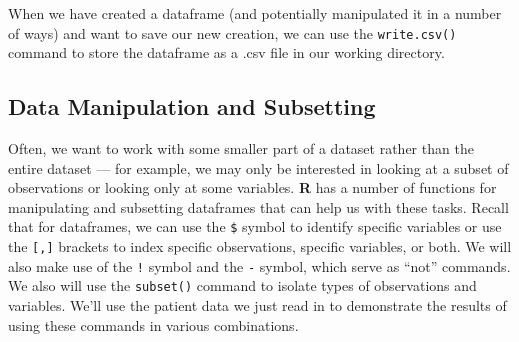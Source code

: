 \documentclass[12pt]{article}\usepackage[]{graphicx}\usepackage[]{color}
\begin{document}
When we have created a dataframe (and potentially manipulated it in a number of ways) and want to save our new creation, we can use the \verb|write.csv()| command to store the dataframe as a .csv file in our working directory.

\subsection{Data Manipulation and Subsetting}
Often, we want to work with some smaller part of a dataset rather than the entire dataset --- for example, we may only be interested in looking at a subset of observations or looking only at some variables. \textbf{R} has a number of functions for manipulating and subsetting dataframes that can help us with these tasks. Recall that for dataframes, we can use the \verb|$| symbol to identify specific variables or use the \verb|[,]| brackets to index specific observations, specific variables, or both. We will also make use of the \verb|!| symbol and the \verb|-| symbol, which serve as ``not'' commands. We also will use the \verb|subset()| command to isolate types of observations and variables. We'll use the patient data we just read in to demonstrate the results of using these commands in various combinations.
\end{document}
